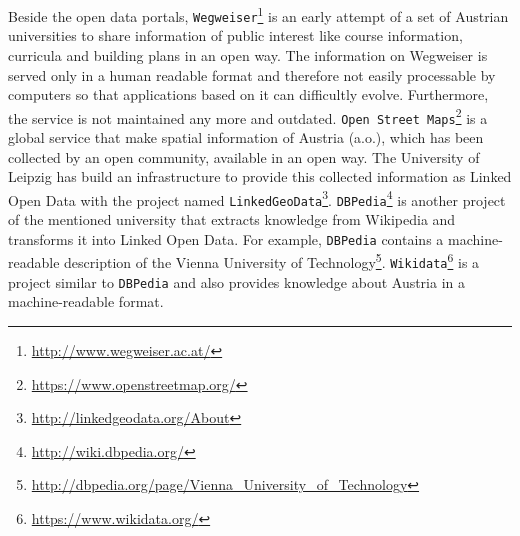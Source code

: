 \documentclass{article}
\begin{document}
Beside the open data portals, \texttt{Wegweiser}\footnote{\url{http://www.wegweiser.ac.at/}} is an early attempt of a set of Austrian universities to share information of public interest like course information, curricula and building plans in an open way. The information on Wegweiser is served only in a human readable format and therefore not easily processable by computers so that applications based on it can difficultly evolve. Furthermore, the service is not maintained any more and outdated. \texttt{Open Street Maps}\footnote{\url{https://www.openstreetmap.org/}} is a global service that make spatial information of Austria (a.o.), which has been collected by an open community, available in an open way. The University of Leipzig has build an infrastructure to provide this collected information as Linked Open Data with the project named \texttt{LinkedGeoData}\footnote{\url{http://linkedgeodata.org/About}}. \texttt{DBPedia}\footnote{\url{http://wiki.dbpedia.org/}} is another project of the mentioned university that extracts knowledge from Wikipedia and transforms it into Linked Open Data. For example, \texttt{DBPedia} contains a machine-readable description of the Vienna University of Technology\footnote{\url{http://dbpedia.org/page/Vienna_University_of_Technology}}. \texttt{Wikidata}\footnote{\url{https://www.wikidata.org/}} is a project similar to \texttt{DBPedia} and also provides knowledge about Austria in a machine-readable format.


\end{document}
